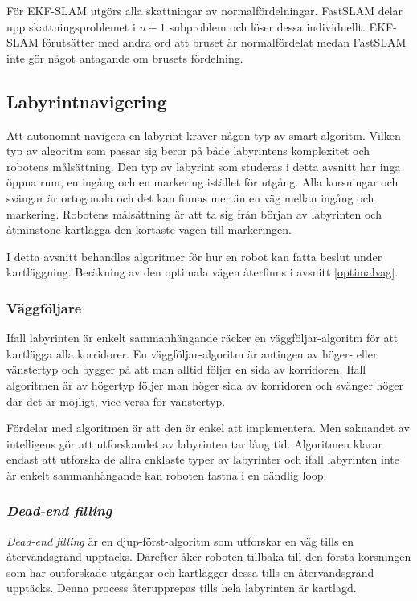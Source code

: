 \documentclass[11pt]{article}
\begin{document}
\begin{flushleft}
För EKF-SLAM utgörs alla skattningar av normalfördelningar. FastSLAM delar upp skattningsproblemet i $n + 1$ subproblem och löser dessa individuellt. EKF-SLAM förutsätter med andra ord att bruset är normalfördelat medan FastSLAM inte gör något antagande om brusets fördelning.

\subsection{Labyrintnavigering}
\label{mapping}
Att autonomnt navigera en labyrint kräver någon typ av smart algoritm. Vilken typ av algoritm som passar sig beror på både labyrintens komplexitet och robotens målsättning. Den typ av labyrint som studeras i detta avsnitt har inga öppna rum, en ingång och en markering istället för utgång. Alla korsningar och svängar är ortogonala och det kan finnas mer än en väg mellan ingång och markering. Robotens målsättning är att ta sig från början av labyrinten och åtminstone kartlägga den kortaste vägen till markeringen.

I detta avsnitt behandlas algoritmer för hur en robot kan fatta beslut under kartläggning. Beräkning av den optimala vägen återfinns i  avsnitt \ref{optimalvag}.

\subsubsection{Väggföljare}
Ifall labyrinten är enkelt sammanhängande räcker en väggföljar-algoritm för att kartlägga alla korridorer. En väggföljar-algoritm är antingen av höger- eller vänstertyp och bygger på att man alltid följer en sida av korridoren. Ifall algoritmen är av högertyp följer man höger sida av korridoren och svänger höger där det är möjligt, vice versa för vänstertyp.

Fördelar med algoritmen är att den är enkel att implementera. Men saknandet av intelligens gör att utforskandet av labyrinten tar lång tid. Algoritmen klarar endast att utforska de allra enklaste typer av labyrinter och ifall labyrinten inte är enkelt sammanhängande kan roboten fastna i en oändlig loop.

\subsubsection{\emph{Dead-end filling}}
\emph{Dead-end filling} är en djup-först-algoritm som utforskar en väg tills en återvändsgränd upptäcks. Därefter åker roboten tillbaka till den första korsningen som har outforskade utgångar och kartlägger dessa tills en återvändsgränd upptäcks. Denna process återupprepas tills hela labyrinten är kartlagd.


\end{flushleft}
\end{document}

